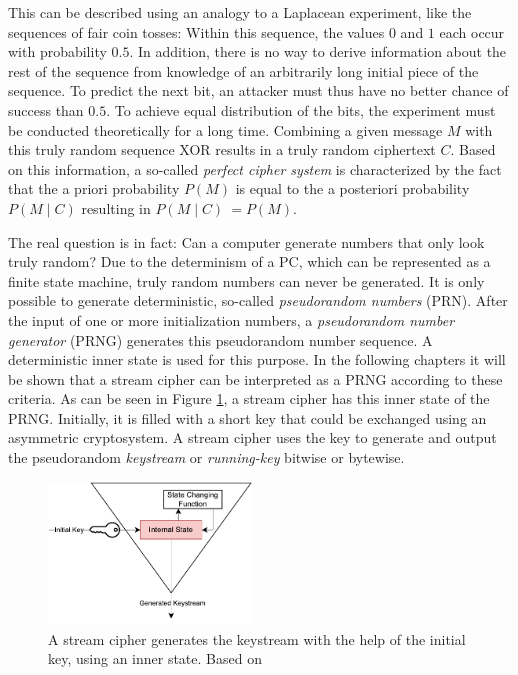 This can be described using an analogy to a Laplacean experiment, like the sequences of fair coin tosses: Within this sequence, the values $0$ and $1$ each occur with probability $0.5$. In addition, there is no way to derive information about the rest of the sequence from knowledge of an arbitrarily long initial piece of the sequence. To predict the next bit, an attacker must thus have no better chance of success than $0.5$. To achieve equal distribution of the bits, the experiment must be conducted theoretically for a long time. Combining a given message $M$ with this truly random sequence XOR results in a truly random ciphertext $C$. Based on this information, a so-called \textit{perfect cipher system} is characterized by the fact that the a priori probability $P\left(M\right)$ is equal to the a posteriori probability $P({M}\mid{C})$ resulting in $P({M}\mid{C})\ = P({M})$. \cite[pp. 52-23]{Ertel.2020}

\pagebreak

The real question is in fact: Can a computer generate numbers that only look truly random? Due to the determinism of a PC, which can be represented as a finite state machine, truly random numbers can never be generated. It is only possible to generate deterministic, so-called \textit{pseudorandom numbers} (PRN). After the input of one or more initialization numbers, a \textit{pseudorandom number generator} (PRNG) generates this pseudorandom number sequence. A deterministic inner state is used for this purpose. \cite[pp. 195-196]{Ertel.2020} In the following chapters it will be shown that a stream cipher can be interpreted as a PRNG according to these criteria. As can be seen in Figure \ref{fig:Figure_2}, a stream cipher has this inner state of the PRNG. Initially, it is filled with a short key that could be exchanged using an asymmetric cryptosystem. A stream cipher uses the key to generate and output the pseudorandom \textit{keystream} or \textit{running-key} bitwise or bytewise. \cite[p. 233]{Schneier.2006} \\

\begin{figure}[h]
	\centering
	\includegraphics[width=0.48\textwidth]{carl/figures/figure_2_new_svg-raw.pdf}
	\caption{A stream cipher generates the keystream with the help of the initial key, using an inner state. Based on \cite[p. 234]{Schneier.2006}}
	\label{fig:Figure_2}
\end{figure}

